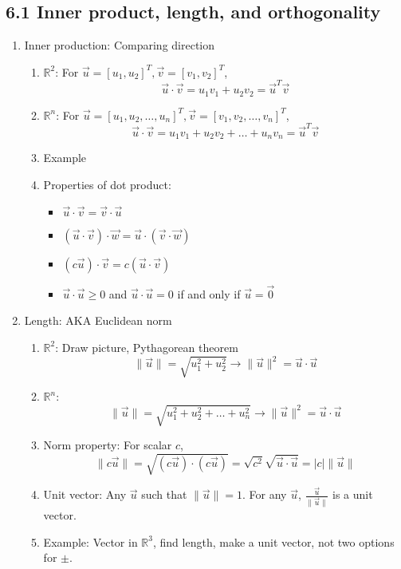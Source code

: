 \documentclass{article}
\begin{document}
\subsection{6.1 Inner product, length, and orthogonality}

\begin{enumerate}

\item Inner production: Comparing direction
\begin{enumerate}
\item $\mathbb{R}^2$: For $\vec{u} = [u_1, u_2]^T, \vec{v} = [v_1, v_2]^T$, 
\[
\vec{u} \cdot \vec{v} = u_1 v_1 + u_2 v_2 = \vec{u}^T \vec{v}
\]
\item $\mathbb{R}^n$: For $\vec{u} = [u_1, u_2, \dots, u_n]^T, \vec{v} = [v_1, v_2, \dots, v_n]^T$, 
\[
\vec{u} \cdot \vec{v} = u_1 v_1 + u_2 v_2 + \dots + u_n v_n = \vec{u}^T \vec{v}
\]
\item Example
\item Properties of dot product:
\begin{itemize}
\item $\vec{u} \cdot \vec{v} = \vec{v} \cdot \vec{u}$
\item $(\vec{u} \cdot \vec{v}) \cdot \vec{w} = \vec{u} \cdot (\vec{v}\cdot \vec{w})$
\item $(c \vec{u}) \cdot \vec{v} = c (\vec{u} \cdot \vec{v})$
\item $\vec{u} \cdot \vec{u} \geq 0$ and $\vec{u} \cdot \vec{u} = 0$ if and only if $\vec{u} = \vec{0}$
\end{itemize}
\end{enumerate}

\item Length: AKA Euclidean norm
\begin{enumerate}
\item $\mathbb{R}^2$: Draw picture, Pythagorean theorem
\[
\| \vec{u} \| = \sqrt{u_1^2 + u_2^2 } \rightarrow \|\vec{u}\|^2 = \vec{u} \cdot \vec{u}
\]
\item $\mathbb{R}^n$:
\[
\| \vec{u} \| = \sqrt{u_1^2 + u_2^2 + \dots + u_n^2} \rightarrow \|\vec{u}\|^2 = \vec{u} \cdot \vec{u}
\]
\item Norm property: For scalar $c$,
\[
\| c \vec{u} \| = \sqrt{(c\vec{u}) \cdot (c \vec{u})}
= \sqrt{c^2} \sqrt{\vec{u} \cdot \vec{u}}
= |c| \| \vec{u} \|
\]
\item Unit vector: Any $\vec{u}$ such that $\|\vec{u}\| = 1$. For any $\vec{u}$, $\frac{\vec{u}}{\|\vec{u}\|}$ is a unit vector.
\item Example: Vector in $\mathbb{R}^3$, find length, make a unit vector, not two options for $\pm$.
\end{enumerate}


\end{enumerate}
\end{document}
